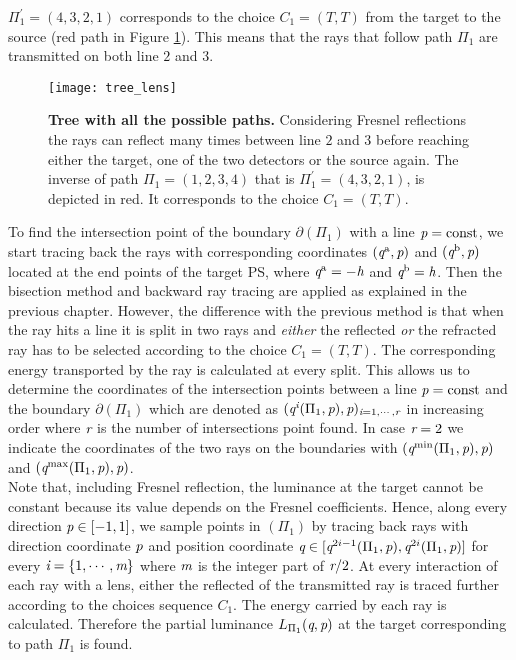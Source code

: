 $\Pi_1^{\prime}=(4,3,2,1)$ corresponds to the choice $C_1= (T,T)$ from the target to the source (red path in Figure \ref{fig:tree_fresnel}). This means that the rays that follow path $\Pi_1$ are transmitted on both line $2$ and $3$. 
\begin{figure}[t]
  \begin{center}
  \texttt{[image: tree\_lens]}
  \end{center}
  \caption{\textbf{Tree with all the possible paths.} Considering Fresnel reflections the rays can reflect many times between line $2$ and $3$ before reaching either the target, one of the two detectors or the source again. The inverse of path $\Pi_1 = (1,2,3,4)$ that is $\Pi_1^{\prime} = (4,3,2,1)$, is depicted in red. It corresponds to the choice $C_1= (T,T)$.}
\label{fig:tree_fresnel}
 \end{figure}
To find the intersection point of the boundary $\partial$$(\Pi_1)$ with a line $\textit{p} = \textrm{const}$, we start tracing back the rays with corresponding coordinates $(\textit{q}^{\textrm{a}}, \textit{p})$ and $(\textit{q}^{\textrm{b}}, \textit{p})$ located at the end points of the target PS, where $\textit{q}^{\textrm{a}} = -\textit{h}$ and $\textit{q}^{\textrm{b}} = \textit{h}$. Then the bisection method and backward ray tracing are applied as explained in the previous chapter. However, the difference with the previous method is that when the ray hits a line it is split in two rays and \textit{either} the reflected \textit{or} the refracted ray has to be selected according to the choice $C_1= (T,T)$. The corresponding energy transported by the ray is calculated at every split. This allows us to determine the coordinates of the intersection points between a line $\textit{p}=\textrm{const}$ and the boundary $\partial$$(\Pi_1)$ which are denoted as $(\textit{q}^{\textit{i}}(\Pi_1, \textit{p}), \textit{p})_{\textit{i}=1, \cdots, \textit{r}}$ in increasing order where $\textit{r}$ is the number of intersections point found. In case $\textit{r}=2$ we indicate the coordinates of the two rays on the boundaries with $(\textit{q}^{\textrm{min}}(\Pi_1, \textit{p}), \textit{p})$ and $(\textit{q}^{\textrm{max}}(\Pi_1, \textit{p}), \textit{p})$. \\ \indent
Note that, including Fresnel reflection, the luminance at the target cannot be constant because its value depends on the Fresnel coefficients. Hence, along every direction $\textit{p}\in[-1,1]$, we sample points in $(\Pi_1)$ by tracing back rays with direction coordinate $\textit{p}$ and position coordinate $\textit{q}\in[\textit{q}^{2i-1}(\Pi_1, \textit{p}), \textit{q}^{2i}(\Pi_1, \textit{p})]$ for every $\textit{i}=\{1, \cdots, \textit{m}\}$ where $\textit{m}$ is the integer part of $\textit{r}/2$. At every interaction of each ray with a lens, either the reflected of the transmitted ray is traced further according to the choices sequence $C_1$. The energy carried by each ray is calculated. Therefore the partial luminance $L_{\Pi_1}(\textit{q},\textit{p})$ at the target corresponding to path $\Pi_1$ is found. 
